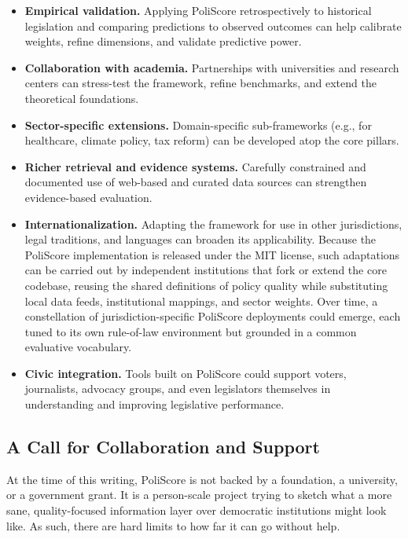 \documentclass[12pt]{article}
\begin{document}
\begin{itemize}
    \item \textbf{Empirical validation.} Applying PoliScore retrospectively to historical legislation and comparing
    predictions to observed outcomes can help calibrate weights, refine dimensions, and validate predictive power.

    \item \textbf{Collaboration with academia.} Partnerships with universities and research centers can stress-test the
    framework, refine benchmarks, and extend the theoretical foundations.

    \item \textbf{Sector-specific extensions.} Domain-specific sub-frameworks (e.g., for healthcare, climate policy, tax
    reform) can be developed atop the core pillars.

    \item \textbf{Richer retrieval and evidence systems.} Carefully constrained and documented use of web-based and
    curated data sources can strengthen evidence-based evaluation.

    \item \textbf{Internationalization.} Adapting the framework for use in other jurisdictions, legal traditions, and
    languages can broaden its applicability. Because the PoliScore implementation is released under the MIT license, such
    adaptations can be carried out by independent institutions that fork or extend the core codebase, reusing the shared
    definitions of policy quality while substituting local data feeds, institutional mappings, and sector weights. Over
    time, a constellation of jurisdiction-specific PoliScore deployments could emerge, each tuned to its own rule-of-law
    environment but grounded in a common evaluative vocabulary.

    \item \textbf{Civic integration.} Tools built on PoliScore could support voters, journalists, advocacy groups, and
    even legislators themselves in understanding and improving legislative performance.
\end{itemize}

\subsection{A Call for Collaboration and Support}

At the time of this writing, PoliScore is not backed by a foundation, a university, or a government grant. It is a
person-scale project trying to sketch what a more sane, quality-focused information layer over democratic institutions
might look like. As such, there are hard limits to how far it can go without help.
\end{document}
